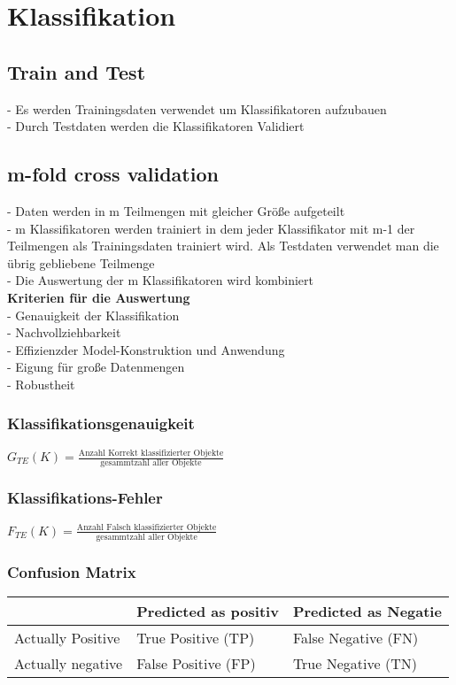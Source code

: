 \documentclass[a4paper]{scrartcl}
\begin{document}
\section{Klassifikation}
\subsection{Train and Test}
- Es werden Trainingsdaten verwendet um Klassifikatoren aufzubauen\\
- Durch Testdaten werden die Klassifikatoren Validiert\\
\subsection{m-fold cross validation}
- Daten werden in m Teilmengen mit gleicher Größe aufgeteilt\\
- m Klassifikatoren werden trainiert in dem jeder Klassifikator mit m-1 der Teilmengen als Trainingsdaten trainiert wird. Als Testdaten verwendet man die übrig gebliebene Teilmenge\\
- Die Auswertung der m Klassifikatoren wird kombiniert\\

\textbf{Kriterien für die Auswertung}\\

- Genauigkeit der Klassifikation\\
- Nachvollziehbarkeit\\
- Effizienzder Model-Konstruktion und Anwendung\\
- Eigung für große Datenmengen\\
- Robustheit\\

\subsubsection{Klassifikationsgenauigkeit}
$G_{TE}(K)=\frac{\text{Anzahl Korrekt klassifizierter Objekte}}{\text{gesammtzahl aller Objekte}}$\\

\subsubsection{Klassifikations-Fehler}
$F_{TE}(K)=\frac{\text{Anzahl Falsch klassifizierter Objekte}}{\text{gesammtzahl aller Objekte}}$\\

\subsubsection{Confusion Matrix}
\begin{tabular}[ht]{|l|l|l|}
  \hline
   & Predicted as positiv & Predicted as Negatie\\
  \hline\hline
  Actually Positive & True Positive (TP) & False Negative (FN)\\\hline
  Actually negative & False Positive (FP) & True Negative (TN)\\
  \hline
\end{tabular}
\end{document}
